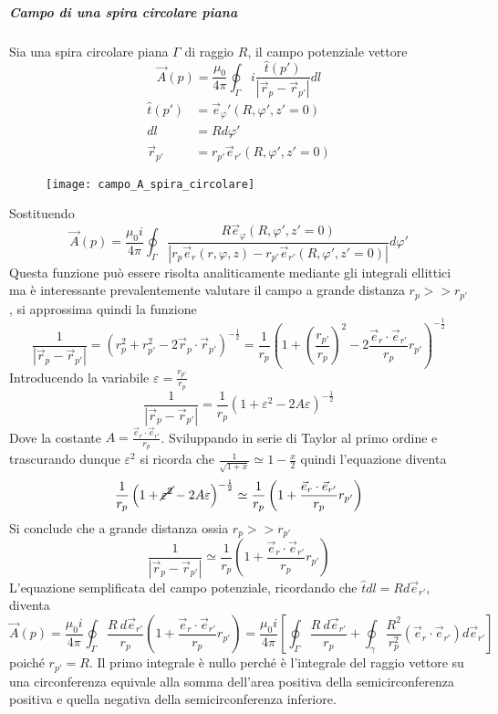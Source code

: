 \subparagraph{Campo di una spira circolare piana}
Sia una spira circolare piana $\Gamma$ di raggio $R$, il campo potenziale vettore
$$
\vec{A}(p) = \frac{\mu_0}{4\pi} \oint_\Gamma i \frac{\hat{t}(p')}{|\vec{r}_p - \vec{r}_{p'}|}dl
$$
\begin{align*}
\hat{t}(p') &= \vec{e}_\varphi' (R,\varphi',z'=0) \\
dl &= R d\varphi'\\
\vec{r}_{p'} & = r_{p'} \vec{e}_{r'} (R,\varphi',z'=0)
\end{align*}
\begin{figure}[H]
\centering
\texttt{[image: campo\_A\_spira\_circolare]}
\end{figure}
Sostituendo
$$
\vec{A}(p) = \frac{\mu_0 i}{4\pi}\oint_\Gamma \frac{R \vec{e}_\varphi (R,\varphi',z'=0)}{|r_p\vec{e}_r(r,\varphi,z)-r_{p'}\vec{e}_{r'}(R,\varphi',z'=0)|}d\varphi'
$$
Questa funzione può essere risolta analiticamente mediante gli integrali ellittici
ma è interessante prevalentemente valutare il campo a grande distanza $r_p >> r_{p'}$,
si approssima quindi la funzione
$$
\frac{1}{|\vec{r}_p-\vec{r}_{p'} |} = \left(r_p^2 + r_{p'}^2 - 2\vec{r}_p\cdot\vec{r}_{p'}\right)^{-\frac{1}{2}} = \frac{1}{r_p}\left(1+\left(\frac{r_{p'}}{r_p}\right)^2 - 2\frac{\vec{e}_r\cdot\vec{e}_{r'}}{r_p}r_{p'}\right)^{-\frac{1}{2}}
$$
Introducendo la variabile $\varepsilon=\frac{r_{p'}}{r_p}$
$$
\frac{1}{|\vec{r}_p-\vec{r}_{p'} |} = \frac{1}{r_p}\left(1 +\varepsilon^2 - 2A\varepsilon\right)^{-\frac{1}{2}}
$$
Dove la costante $A = \frac{\vec{e}_r\cdot\vec{e}_{r'}}{r_p}$.
Sviluppando in serie di Taylor al primo ordine e trascurando dunque $\varepsilon^2$ si 
ricorda che $\frac{1}{\sqrt{1+x}}\simeq 1 -\frac{x}{2} $ quindi l'equazione diventa
$$
\frac{1}{r_p}\left(1 +\cancel{\varepsilon^2} - 2A\varepsilon\right)^{-\frac{1}{2}} \simeq \frac{1}{r_p}\left(1+\frac{\vec{e}_r\cdot\vec{e}_{r'}}{r_p}r_{p'}\right) 
$$
Si conclude che a grande distanza ossia $r_p >> r_{p'}$
$$
\frac{1}{|\vec{r}_p-\vec{r}_{p'}|} \simeq \frac{1}{r_p} \left(1 + \frac{\vec{e}_r\cdot\vec{e}_{r'}}{r_p}r_{p'}\right)
$$
L'equazione semplificata del campo potenziale, ricordando che  $\hat{t}dl = Rd\vec{e}_{r'}$, diventa
$$
\vec{A}(p) = \frac{\mu_0 i}{4\pi}\oint_\Gamma \frac{R\ d\vec{e}_{r'}}{r_p} \left(1 + \frac{\vec{e}_r\cdot\vec{e}_{r'}}{r_p}r_{p'}\right) = \frac{\mu_0 i}{4\pi}\left[ \oint_\Gamma \frac{R\ d\vec{e}_{r'}}{r_p} + \oint_\gamma \frac{R^2}{r_p^2}(\vec{e}_r\cdot\vec{e}_{r'})d\vec{e}_{r'}\right]
$$
poiché $r_{p'} = R$. Il primo integrale è nullo perché è l'integrale del raggio vettore
su una circonferenza equivale alla somma dell'area positiva della semicirconferenza 
positiva e quella negativa della semicirconferenza inferiore.

